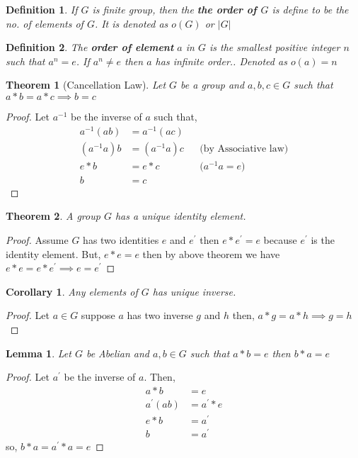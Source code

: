 \documentclass[12pt,a4paper]{article}
\newtheorem{thm}{Theorem}
\newtheorem{defn}{Definition}
\newtheorem{lem}{Lemma}
\newtheorem{cor}{Corollary}
\begin{document}
  \begin{defn}
    If $G$ is finite group, then the \textbf{the order of $G$} is define to be the no. of elements of $G$. It is denoted as $o(G)$ or $|G|$
  \end{defn}
  \begin{defn}
    The \textbf{order of element} $a$ in $G$ is the smallest positive integer $n$ such that $a^n = e$. If  $a^n \neq e$ then $a$ has \textit{infinite order.}. Denoted as $o(a)=n$
  \end{defn}
  \begin{thm}[Cancellation Law]
    Let $G$ be a group and $a,b,c\in G$ such that $a*b=a*c \implies b=c$
  \end{thm}
   \begin{proof}
   Let $a^{-1}$ be the inverse of $a$ such that,
   \[
   \begin{aligned}
    a^{-1}(ab) &= a^{-1}(ac) \\
    (a^{-1}a)b &= (a^{-1}a)c    && \text{(by Associative law)}\\
    e*b &= e*c          && \text{($a^{-1}a=e$)} \\
    b &=c
   \end{aligned}
   \] 
   \end{proof}
  \begin{thm}
    A group $G$ has a unique identity element.
  \end{thm} 
  \begin{proof}
  Assume $G$ has two identities $e$ and $e^{\prime}$ then $e*e^{\prime}=e$ because $e^{\prime}$ is the identity element. But, $e*e=e$ then by above theorem we have $e*e=e*e^{\prime} \implies e =e^{\prime}$ 
  \end{proof}
  \begin{cor}
    Any elements of $G$ has unique inverse.
  \end{cor}
  \begin{proof}
    Let $a\in G$ suppose $a$ has two inverse $g$ and $h$ then, $a*g=a*h \implies g=h$
  \end{proof}
  \begin{lem}
    Let $G$ be Abelian and $a,b \in G$ such that $a*b=e$ then $b*a=e$
  \end{lem}
  \begin{proof} Let $a^{\prime}$ be the inverse of $a$. Then,
  \[
    \begin{aligned}
    a*b &= e \\
    a^{\prime}(ab) &= a^{\prime}*e \\
    e*b &= a^{\prime} \\
    b &= a^{\prime}
  \end{aligned}
  \]
  so, $b*a = a^{\prime}*a=e$
  \end{proof}
\end{document}
